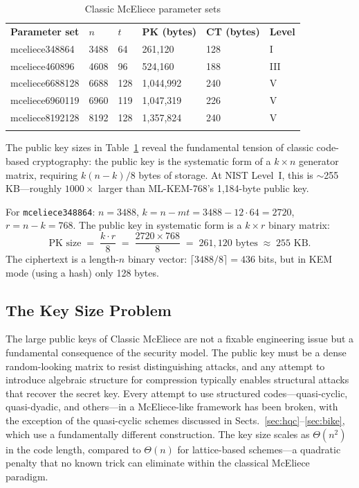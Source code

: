 \begin{table}[t]
\caption{Classic McEliece parameter sets}
\label{tab:mceliece-params}
\begin{tabular}{p{3.5cm}p{1.5cm}p{1.5cm}p{2cm}p{2cm}p{1.5cm}}
\hline\noalign{\smallskip}
\textbf{Parameter set} & \textbf{$n$} & \textbf{$t$} & \textbf{PK (bytes)} & \textbf{CT (bytes)} & \textbf{Level} \\
\noalign{\smallskip}\svhline\noalign{\smallskip}
mceliece348864  & 3488 & 64  & 261,120  & 128  & I \\
mceliece460896  & 4608 & 96  & 524,160  & 188  & III \\
mceliece6688128 & 6688 & 128 & 1,044,992 & 240 & V \\
mceliece6960119 & 6960 & 119 & 1,047,319 & 226 & V \\
mceliece8192128 & 8192 & 128 & 1,357,824 & 240 & V \\
\noalign{\smallskip}\hline
\end{tabular}
\end{table}

The public key sizes in Table~\ref{tab:mceliece-params} reveal the fundamental tension of classic code-based cryptography: the public key is the systematic form of a $k \times n$ generator matrix, requiring $k(n-k)/8$ bytes of storage.  At NIST Level~I, this is $\sim$255\,KB---roughly $1000\times$ larger than ML-KEM-768's 1,184-byte public key.

\begin{example}
\label{ex:key-size}
For \texttt{mceliece348864}: $n = 3488$, $k = n - mt = 3488 - 12 \cdot 64 = 2720$, $r = n - k = 768$.  The public key in systematic form is a $k \times r$ binary matrix:
\begin{equation}
\text{PK size} \;=\; \frac{k \cdot r}{8} \;=\; \frac{2720 \times 768}{8} \;=\; 261{,}120 \text{ bytes} \;\approx\; 255\text{ KB}.
\end{equation}
The ciphertext is a length-$n$ binary vector: $\lceil 3488/8 \rceil = 436$ bits, but in KEM mode (using a hash) only 128 bytes.
\end{example}


\subsection{The Key Size Problem}
\label{subsec:key-size-problem}

The large public keys of Classic McEliece are not a fixable engineering issue but a fundamental consequence of the security model.  The public key must be a dense random-looking matrix to resist distinguishing attacks, and any attempt to introduce algebraic structure for compression typically enables structural attacks that recover the secret key.  Every attempt to use structured codes---quasi-cyclic, quasi-dyadic, and others---in a McEliece-like framework has been broken, with the exception of the quasi-cyclic schemes discussed in Sects.~\ref{sec:hqc}--\ref{sec:bike}, which use a fundamentally different construction.  The key size scales as $\Theta(n^2)$ in the code length, compared to $\Theta(n)$ for lattice-based schemes---a quadratic penalty that no known trick can eliminate within the classical McEliece paradigm.

